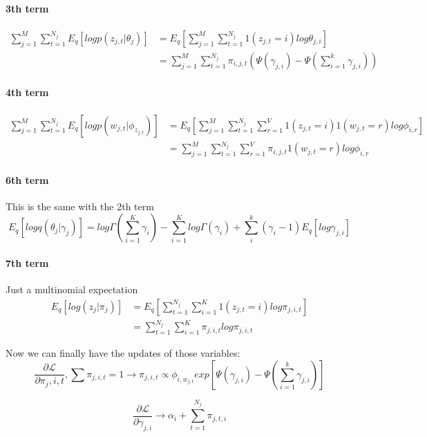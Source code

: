 \documentclass{article}
\begin{document}
\paragraph{3th term}
\begin{align*}
\sum_{j=1}^{M}\sum_{t=1}^{N_{j}}E_{q}[logp(z_{j,t}| \theta_{j})] &=E_{q}\left[ \sum_{j=1}^{M}\sum_{t=1}^{N_{j}} 1(z_{j,t}=i)log \theta_{j,i} \right] \\
&= \sum_{j=1}^{M}\sum_{t=1}^{N_{j}} \pi_{i,j,t} \left( \Psi(\gamma_{j,i})-\Psi\left( \sum_{i=1}^{k} \gamma_{j,i} \right)\right)
\end{align*}
\paragraph{4th term}
\begin{align*}
\sum_{j=1}^{M}\sum_{t=1}^{N_{j}}E_{q}[logp(w_{j,t}|\phi_{z_{j,t}})] &= E_{q}\left[\sum_{j=1}^{M}\sum_{t=1}^{N_{j}}\sum_{r=1}^{V}1(z_{j,t}=i)1(w_{j,t}=r)log\phi_{i,r} \right] \\
&= \sum_{j=1}^{M}\sum_{t=1}^{N_{j}}\sum_{r=1}^{V} \pi_{i,j,t}1(w_{j,t}=r) log\phi_{i,r}
\end{align*}
\paragraph{6th term}
This is the same with the 2th term
$$E_{q}[logq(\theta_{j}|\gamma_{j})] = log \Gamma(\sum_{i=1}^{K}\gamma_{i})-\sum_{i=1}^{K}log \Gamma(\gamma_{i}) +\sum_{i}^{k}(\gamma_{i}-1)E_{q}[log\gamma_{j,i}] $$
\paragraph{7th term} Just a multinomial expectation
\begin{align*}
E_{q}[log(z_{j}|\pi_{j})] &=E_{q}\left[ \sum_{t=1}^{N_{j}}\sum_{i=1}^{K}1(z_{j,t}=i)log\pi_{j,i,t} \right] \\
&= \sum_{t=1}^{N_{j}}\sum_{i=1}^{K} \pi_{j,i,t}log \pi_{j,i,t}
\end{align*}

Now we can finally have the updates of those variables:
$$\frac{\partial \mathcal{L}}{\partial \pi_j,i,t},\sum \pi_{j,i,t}=1 \longrightarrow 
\pi_{j,i,t} \propto \phi_{i,w_{j,t}} exp\left[ \Psi(\gamma_{j,i})-\Psi\left(\sum_{i=1}^{k} \gamma_{j,i}\right) \right]$$ 

$$\frac{\partial \mathcal{L}}{\partial \gamma_{j,i}} \longrightarrow \alpha_{i}+\sum_{t=1}^{N_{j}} \pi_{j,t,i} $$
\end{document}
